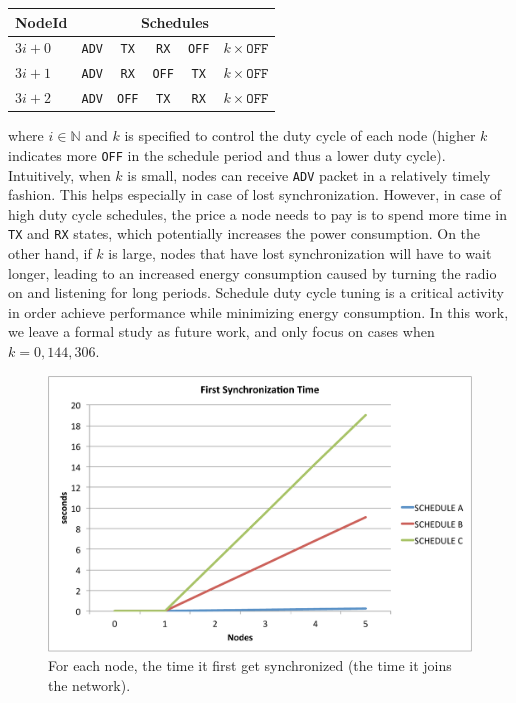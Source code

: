 \begin{tabular}{ l | c | c | c | c | c }
  \hline                       
  NodeId & \multicolumn{5}{c}{Schedules} \\
  \hline
  $3i+0$ & \texttt{ADV} & \texttt{TX} & \texttt{RX} & \texttt{OFF} & $k \times \texttt{OFF}$ \\
  $3i+1$ & \texttt{ADV} & \texttt{RX} & \texttt{OFF} & \texttt{TX} & $k \times \texttt{OFF}$ \\
  $3i+2$ & \texttt{ADV} & \texttt{OFF} & \texttt{TX} & \texttt{RX} & $k \times \texttt{OFF}$ \\
  \hline  
\end{tabular}
where $i \in \mathbb{N}$ and $k$ is specified to control the duty cycle of each node (higher $k$ indicates more \texttt{OFF} in the schedule period and thus a lower duty cycle). Intuitively, when $k$ is small, nodes can receive \texttt{ADV} packet in a relatively timely fashion. This helps especially in case of lost synchronization. However, in case of high duty cycle schedules, the price a node needs to pay is to spend more time in \texttt{TX} and \texttt{RX} states, which potentially increases the power consumption. On the other hand, if $k$ is large, nodes that have lost synchronization will have to wait longer, leading to an increased energy consumption caused by turning the radio on and listening for long periods. Schedule duty cycle tuning is a critical activity in order achieve performance while minimizing energy consumption. In this work, we leave a formal study as future work, and only focus on cases when $k = 0, 144, 306$.

\begin{figure}[t]
\centering
\includegraphics[width=0.9\columnwidth]{figures/synch_time_sched_big}
\caption{For each node, the time it first get synchronized (the time it joins the network).}
\label{fig:time_sync}
\end{figure}

